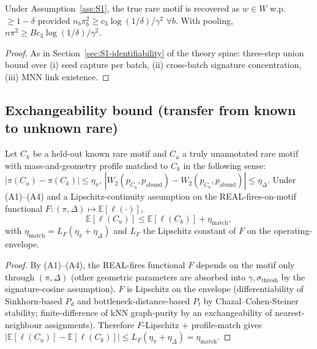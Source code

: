 \begin{theorem}[Identifiability]
\label{thm:S1-identifiability}
Under Assumption~\ref{ass:S1}, the true rare motif is recovered as $w\in W$ w.p.\ $\geq 1-\delta$ provided $n_{b}\pi_{b}^{2}\geq c_{3}\log(1/\delta)/\gamma^{2}$ $\forall b$. With pooling, $n\pi^{2}\geq B c_{3}\log(1/\delta)/\gamma^{2}$.
\end{theorem}

\begin{proof}
As in Section~\ref{sec:S1-identifiability} of the theory spine: three-step union bound over (i) seed capture per batch, (ii) cross-batch signature concentration, (iii) MNN link existence.
\end{proof}

\subsection{Exchangeability bound (transfer from known to unknown rare)}
\label{sec:S1-exchangeability}

\begin{lemma}
\label{lem:S1-exchangeability}\label{lem:exchangeability}
Let $C_{k}$ be a held-out known rare motif and $C_{u}$ a truly unannotated rare motif with mass-and-geometry profile matched to $C_{k}$ in the following sense: $|\pi(C_{u})-\pi(C_{k})|\leq \eta_{\pi}$, $|W_{2}(p_{C_{u}},p_{\text{abund}})-W_{2}(p_{C_{k}},p_{\text{abund}})|\leq \eta_{\Delta}$. Under (A1)--(A4) and a Lipschitz-continuity assumption on the REAL-fires-on-motif functional $F:(\pi,\Delta)\mapsto \mathbb{E}[\ell(\cdot)]$,
\[
  \mathbb{E}[\ell(C_{u})]\leq \mathbb{E}[\ell(C_{k})] + \eta_{\mathrm{match}},
\]
with $\eta_{\mathrm{match}}=L_{F}(\eta_{\pi}+\eta_{\Delta})$ and $L_{F}$ the Lipschitz constant of $F$ on the operating-envelope.
\end{lemma}

\begin{proof}
By (A1)--(A4), the REAL-fires functional $F$ depends on the motif only through $(\pi, \Delta)$ (other geometric parameters are absorbed into $\gamma, \sigma_{\text{thresh}}$ by the signature-cosine assumption). $F$ is Lipschitz on the envelope (differentiability of Sinkhorn-based $P_{d}$ and bottleneck-distance-based $P_{t}$ by Chazal--Cohen-Steiner stability; finite-difference of kNN graph-purity by an exchangeability of nearest-neighbour assignments). Therefore $F$-Lipschitz + profile-match gives $|\mathbb{E}[\ell(C_{u})]-\mathbb{E}[\ell(C_{k})]|\leq L_{F}(\eta_{\pi}+\eta_{\Delta})=\eta_{\mathrm{match}}$.
\end{proof}

